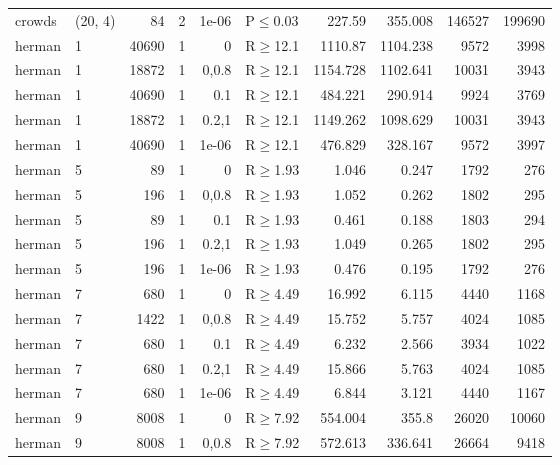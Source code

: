 \begin{longtable}{llrrrlrrrr}
 crowds        & (20, 4)  &     	84 &   2 & 1e-06 & P$\leq$0.03  & 227.59   & 355.008  & 146527  & 199690 \\
 herman        & 1        &  	40690 &   1 & 0     & R$\geq$12.1  & 1110.87  & 1104.238 & 9572    & 3998   \\
 herman        & 1        &  	18872 &   1 & 0,0.8 & R$\geq$12.1  & 1154.728 & 1102.641 & 10031   & 3943   \\
 herman        & 1        &  	40690 &   1 & 0.1   & R$\geq$12.1  & 484.221  & 290.914  & 9924    & 3769   \\
 herman        & 1        &  	18872 &   1 & 0.2,1 & R$\geq$12.1  & 1149.262 & 1098.629 & 10031   & 3943   \\
 herman        & 1        &  	40690 &   1 & 1e-06 & R$\geq$12.1  & 476.829  & 328.167  & 9572    & 3997   \\
 herman        & 5        &     	89 &   1 & 0     & R$\geq$1.93  & 1.046    & 0.247    & 1792    & 276    \\
 herman        & 5        &    	196 &   1 & 0,0.8 & R$\geq$1.93  & 1.052    & 0.262    & 1802    & 295    \\
 herman        & 5        &     	89 &   1 & 0.1   & R$\geq$1.93  & 0.461    & 0.188    & 1803    & 294    \\
 herman        & 5        &    	196 &   1 & 0.2,1 & R$\geq$1.93  & 1.049    & 0.265    & 1802    & 295    \\
 herman        & 5        &    	196 &   1 & 1e-06 & R$\geq$1.93  & 0.476    & 0.195    & 1792    & 276    \\
 herman        & 7        &    	680 &   1 & 0     & R$\geq$4.49  & 16.992   & 6.115    & 4440    & 1168   \\
 herman        & 7        &   	1422 &   1 & 0,0.8 & R$\geq$4.49  & 15.752   & 5.757    & 4024    & 1085   \\
 herman        & 7        &    	680 &   1 & 0.1   & R$\geq$4.49  & 6.232    & 2.566    & 3934    & 1022   \\
 herman        & 7        &    	680 &   1 & 0.2,1 & R$\geq$4.49  & 15.866   & 5.763    & 4024    & 1085   \\
 herman        & 7        &    	680 &   1 & 1e-06 & R$\geq$4.49  & 6.844    & 3.121    & 4440    & 1167   \\
 herman        & 9        &   	8008 &   1 & 0     & R$\geq$7.92  & 554.004  & 355.8    & 26020   & 10060  \\
 herman        & 9        &   	8008 &   1 & 0,0.8 & R$\geq$7.92  & 572.613  & 336.641  & 26664   & 9418   \\

\end{longtable}
